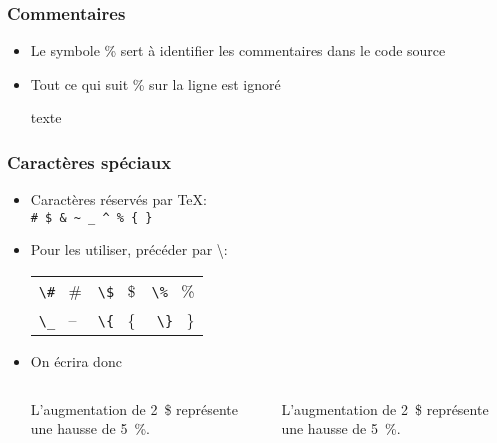 \begin{frame}[fragile]
	
	\frametitle{Commentaires}
	
	\begin{itemize}
		\item Le symbole \% sert à identifier les commentaires dans le code	source
		\item Tout ce qui suit \% sur la ligne est ignoré
		
		\begin{codesource}
	texte %
		\end{codesource}
	\end{itemize}
\end{frame}


\begin{frame}[fragile]

	\frametitle{Caractères spéciaux}
	
	\begin{itemize}
		\item Caractères réservés par \TeX  : \\
		\lstinline|# $ & ~ _ ^ % { }|
		
		\item Pour les utiliser, précéder par \textbackslash  :\\
		\begin{tabular}{lcr}
			\lstinline|\#| \faArrowRight\ \#	&	\lstinline|\$| \faArrowRight\ \$	&	\lstinline|\%| \faArrowRight\ \% \\
			\lstinline|\_| \faArrowRight\ --	&	\lstinline|\{| \faArrowRight\ \{	&	\lstinline|\}| \faArrowRight\ \}
		\end{tabular}
	
		\item On écrira donc
		
		\begin{columns}
			
	\begin{codesource}
	L'augmentation de 2~\$ représente
	une hausse de 5~\%.	
	\end{codesource}
			
			
			L’augmentation de 2~\$ représente une hausse de 5~\%.
		\end{columns}
	\end{itemize}

\end{frame}

